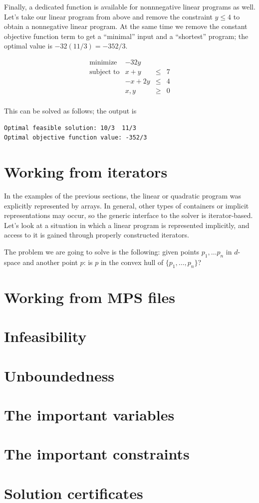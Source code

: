 Finally, a dedicated function is available for nonnnegative linear
programs as well. Let's take our linear program from above and remove
the constraint $y\leq 4$ to obtain a nonnegative linear program. At
the same time we remove the constant objective function term to get
a ``minimal'' input and a ``shortest'' program; the optimal value is
$-32(11/3)=-352/3$.

\[
\begin{array}{lrcl}
\mbox{minimize}       & - 32y \\
\mbox{subject to}     & x + y &\leq& 7 \\
                      & -x + 2y &\leq& 4 \\
                      & x,y &\geq& 0 \\
\end{array}
\] 

This can be solved as follows; the output is
\begin{verbatim}
Optimal feasible solution: 10/3  11/3
Optimal objective function value: -352/3
\end{verbatim}


\section{Working from iterators}\label{sec:QP-working_from_iterators}
In the examples of the previous sections, the linear or quadratic
program was explicitly represented by arrays. In general, other types
of containers or implicit representations may occur, so the
generic interface to the solver is iterator-based. Let's look at a
situation in which a linear program is represented implicitly, and
access to it is gained through properly constructed iterators.

The problem we are going to solve is the following: given
points $p_1,\ldots p_{n}$ in $d$-space and another point $p$: is $p$
in the convex hull of $\{p_1,\ldots,p_{n}\}$? 

\section{Working from MPS files}

\section{Infeasibility}\label{sec:QP-infeasible}

\section{Unboundedness}\label{sec:QP-unbounded}

\section{The important variables}

\section{The important constraints}

\section{Solution certificates}




